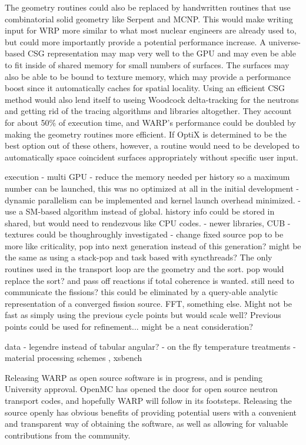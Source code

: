 The geometry routines could also be replaced by handwritten routines that use combinatorial solid geometry like Serpent and MCNP.  This would make writing input for WRP more similar to what most nuclear engineers are already used to, but could more importantly provide a potential performance increase.  A universe-based CSG representation may map very well to the GPU and may even be able to fit inside of shared memory for small numbers of surfaces.  The surfaces may also be able to be bound to texture memory, which may provide a performance boost since it automatically caches for spatial locality.  Using an efficient CSG method would also lend itself to useing Woodcock delta-tracking for the neutrons and getting rid of the tracing algorithms and libraries altogether.  They account for about 50\% of execution time, and WARP's performance could be doubled by making the geometry routines more efficient.  If OptiX is determined to be the best option out of these others, however, a routine would need to be developed to automatically space coincident surfaces appropriately without specific user input.

execution
- multi GPU
- reduce the memory needed per history so a maximum number can be launched, this was no optimized at all in the initial development
- dynamic parallelism can be implemented and kernel launch overhead minimized.  
- use a SM-based algorithm instead of global.  history info could be stored in shared, but would need to rendezvous like CPU codes.
- newer libraries, CUB
- textures could be thoughroughly investigated
- change fixed source pop to be more like criticality, pop into next generation instead of this generation?  might be the same as using a stack-pop and task based with syncthreads?  The only routines used in the transport loop are the geometry and the sort.   pop would replace the sort?  and pass off reactions if total coherence is wanted.  still need to communicate the fissions?  this could be eliminated by a query-able analytic representation of a converged fission source.  FFT, something else.  Might not be fast as simply using the previous cycle points but would scale well?  Previous points could be used for refinement...  might be a neat consideration?

data
- legendre instead of tabular angular?
- on the fly temperature treatments
- material processing schemes , xsbench \cite{openmc}

Releasing WARP as open source software is in progress, and is pending University approval.  OpenMC has opened the door for open source neutron transport codes, and hopefully WARP will follow in its footsteps.  Releasing the source openly has obvious benefits of providing potential users with a convenient and transparent way of obtaining the software, as well as allowing for valuable contributions from the community.  






